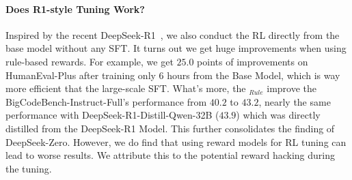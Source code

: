 \paragraph{Does R1-style Tuning Work?}
Inspired by the recent DeepSeek-R1~\citep{DeepseekR1}, we also conduct the RL directly from the base model without any SFT. It turns out we get huge improvements when using rule-based rewards. For example, we get $25.0$ points of improvements on HumanEval-Plus after training only 6 hours from the Base Model, which is way more efficient that the large-scale SFT. What's more, the \coder$_{Rule}$ improve the BigCodeBench-Instruct-Full's performance from $40.2$ to $43.2$, nearly the same performance with DeepSeek-R1-Distill-Qwen-32B ($43.9$) which was directly distilled from the DeepSeek-R1 Model. This further consolidates the finding of DeepSeek-Zero. However, we do find that using reward models for RL tuning can lead to worse results. We attribute this to the potential reward hacking during the tuning. 





